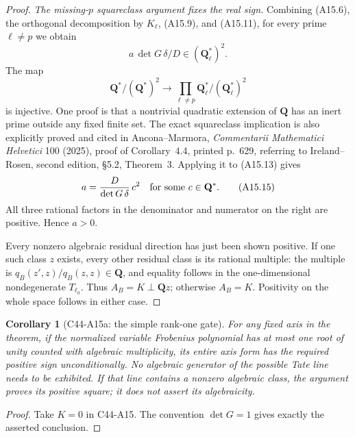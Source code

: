 \documentclass[11pt]{article}
\newtheorem{corollary}[theorem]{Corollary}
\theoremstyle{remark}\newtheorem{remark}[theorem]{Remark}
\begin{document}
\begin{proof}
\emph{The missing-$p$ squareclass argument fixes the real sign.}
Combining (A15.6), the orthogonal decomposition by $K_\ell$,
(A15.9), and (A15.11), for every prime $\ell\ne p$ we obtain
\[
            a\,\det G\,\delta/D\in(\mathbf Q_\ell^*)^2.
 \tag{A15.13}
\]
The map
\[
 \mathbf Q^*/(\mathbf Q^*)^2\longrightarrow
        \prod_{\ell\ne p}\mathbf Q_\ell^*/(\mathbf Q_\ell^*)^2
 \tag{A15.14}
\]
is injective. One proof is that a nontrivial quadratic extension
of $\mathbf Q$ has an inert prime outside any fixed finite
set. The exact squareclass implication is also explicitly
proved and cited in Ancona--Marmora, \emph{Commentarii
Mathematici Helvetici} 100 (2025), proof of Corollary~4.4,
printed p.~629, referring to Ireland--Rosen, second edition,
\S5.2, Theorem~3. Applying it to (A15.13) gives
\[
                     a=\frac{D}{\det G\,\delta}\,c^2
                       \quad\hbox{for some }c\in\mathbf Q^*.
 \tag{A15.15}
\]
All three rational factors in the denominator and numerator
on the right are positive. Hence $a>0$.

Every nonzero algebraic residual direction has just been
shown positive. If one such class $z$ exists, every other
residual class is its rational multiple: the multiple is
$q_B(z',z)/q_B(z,z)\in\mathbf Q$, and equality follows in
the one-dimensional nondegenerate $T_{\ell_0}$. Thus
$A_B=K\perp\mathbf Qz$; otherwise $A_B=K$. Positivity
on the whole space follows in either case.
\end{proof}

\begin{corollary}[C44-A15a: the simple rank-one gate]
For any fixed axis in the theorem, if the normalized variable
Frobenius polynomial has at most one root of unity counted
with algebraic multiplicity, its entire axis form has the
required positive sign unconditionally. No algebraic
generator of the possible Tate line needs to be exhibited.
If that line contains a nonzero algebraic class, the argument
proves its positive square; it does not assert its algebraicity.
\end{corollary}

\begin{proof}
Take $K=0$ in C44-A15. The convention $\det G=1$ gives
exactly the asserted conclusion.
\end{proof}
\end{document}
